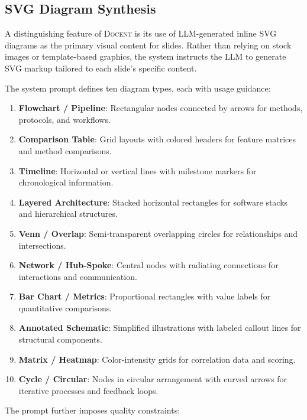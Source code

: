 \documentclass[11pt,a4paper]{article}
\newcommand{\system}{\textsc{Docent}\xspace}
\begin{document}
\subsection{SVG Diagram Synthesis}
\label{sec:svg}

A distinguishing feature of \system is its use of LLM-generated inline SVG diagrams as the primary visual content for slides.
Rather than relying on stock images or template-based graphics, the system instructs the LLM to generate SVG markup tailored to each slide's specific content.

The system prompt defines ten diagram types, each with usage guidance:

\begin{enumerate}[leftmargin=*,nosep]
    \item \textbf{Flowchart / Pipeline}: Rectangular nodes connected by arrows for methods, protocols, and workflows.
    \item \textbf{Comparison Table}: Grid layouts with colored headers for feature matrices and method comparisons.
    \item \textbf{Timeline}: Horizontal or vertical lines with milestone markers for chronological information.
    \item \textbf{Layered Architecture}: Stacked horizontal rectangles for software stacks and hierarchical structures.
    \item \textbf{Venn / Overlap}: Semi-transparent overlapping circles for relationships and intersections.
    \item \textbf{Network / Hub-Spoke}: Central nodes with radiating connections for interactions and communication.
    \item \textbf{Bar Chart / Metrics}: Proportional rectangles with value labels for quantitative comparisons.
    \item \textbf{Annotated Schematic}: Simplified illustrations with labeled callout lines for structural components.
    \item \textbf{Matrix / Heatmap}: Color-intensity grids for correlation data and scoring.
    \item \textbf{Cycle / Circular}: Nodes in circular arrangement with curved arrows for iterative processes and feedback loops.
\end{enumerate}

The prompt further imposes quality constraints:
\end{document}
